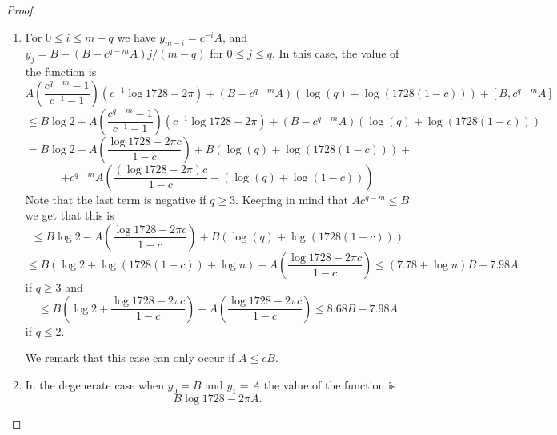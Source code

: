 \documentclass[10pt,a4paper]{amsart}
\begin{document}
\begin{proof}
\begin{enumerate}
\item For $0\leq i\leq m-q$ we have $y_{m-i}=c^{-i}A$, and $y_j=B-(B-c^{q-m}A)j/(m-q)$ for $0\leq j\leq q$. In this case, the
value of the function is
\[A \left(\frac{c^{q-m}-1}{c^{-1}-1}\right)\left(c^{-1}\log
1728-2\pi\right)+(B-c^{q-m}A)(\log(q)+\log(1728(1-c)))+\left[B,c^{q-m}A\right]\]
\[\leq B\log 2 + A \left(\frac{c^{q-m}-1}{c^{-1}-1}\right)\left(c^{-1}\log
1728-2\pi\right)+(B-c^{q-m}A)(\log(q)+\log(1728(1-c)))\]
\[= B\log 2 - A \left(\frac{\log
  1728-2\pi c}{1-c}\right)+B(\log(q)+\log(1728(1-c)))+\]
\[+c^{q-m}A\left(\frac{(\log
1728-2\pi) c}{1-c}-(\log(q)+\log(1-c))\right)\]
Note that the last term is negative if $q\geq 3$. Keeping in
mind that $Ac^{q-m}\leq B$ we get that this is
\[\leq B\log 2 - A \left(\frac{\log
1728-2\pi c}{1-c}\right)+B(\log(q)+\log(1728(1-c)))\]
\[\leq B\left(\log 2 +\log(1728(1-c))+\log n\right)- A \left(\frac{\log
1728-2\pi c}{1-c}\right)\leq (7.78+\log n)B-7.98A\]
if $q\geq 3$ and 
\[\leq B\left(\log 2+\frac{\log
1728-2\pi c}{1-c}\right) - A \left(\frac{\log
1728-2\pi c}{1-c}\right)\leq 8.68B -7.98A\]
if $q\leq 2$. 


We remark that this case can only occur if $A\leq cB$.
\item In the degenerate case when $y_0=B$ and $y_1=A$ the value
of the function is
\[B\log 1728-2\pi A.\]
\end{enumerate}


\end{proof}
\end{document}
